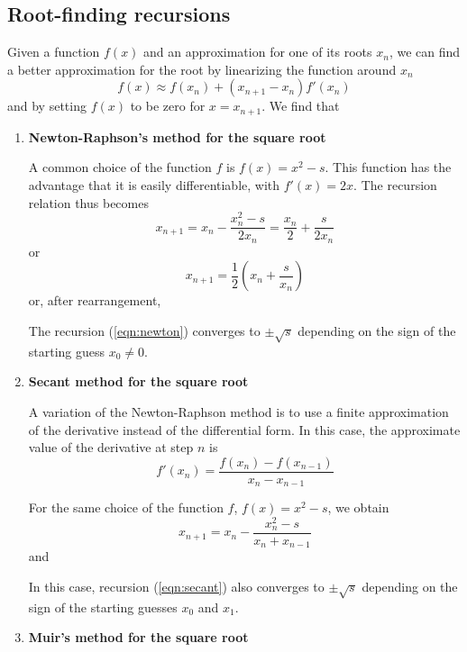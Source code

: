 \subsection{Root-finding recursions}
Given a function $f(x)$ and an approximation for one of its roots
$x_n$, we can find a better approximation for the root by linearizing
the function around $x_n$
\[f(x) \approx f(x_n)+(x_{n+1}-x_n) f'(x_n) \]
and by setting $f(x)$ to be zero for $x=x_{n+1}$. We find that
\beq \label{eqn:newton-raphson}
 \eeq
\begin {enumerate}
%
\item {\bf Newton-Raphson's method for the square root} 
\par
A common choice of the function $f$ is $f(x)=x^2-s$. This
function has the advantage that it is easily differentiable, with
$f'(x)=2x$. The recursion relation thus becomes
\[ x_{n+1}=x_{n}-\frac{x_n^2-s}{2x_n}
=\frac{x_n}{2}+\frac{s}{2x_n} \]
or
\[ x_{n+1}=\frac{1}{2}\left(x_n+\frac{s}{x_n}\right) \]
or, after rearrangement,
\beq \label{eqn:newton}
 \eeq
\par
The recursion (\ref{eqn:newton}) converges to $\pm \sqrt{s}$ depending
on the sign of the starting guess $x_0\ne 0$.
%
\item {\bf Secant method for the square root} 
\par
A variation of the Newton-Raphson method is to use a finite
approximation of the derivative instead of the differential form. In
this case, the approximate value of the derivative at step $n$ is
\[ f'(x_n)=\frac{f(x_n)-f(x_{n-1})}{x_{n}-x_{n-1}} \]
\par
For the same choice of the function $f$, $f(x)=x^2-s$, we
obtain
\[ x_{n+1}=x_{n}-\frac{x_n^2-s}{x_n+x_{n-1}}\]
and
\beq \label{eqn:secant}
 \eeq
\par
In this case, recursion (\ref{eqn:secant}) also converges to $\pm
\sqrt{s}$ depending on the sign of the starting guesses $x_0$ and
$x_1$.
%
\item {\bf Muir's method for the square root} 


\end{enumerate}
